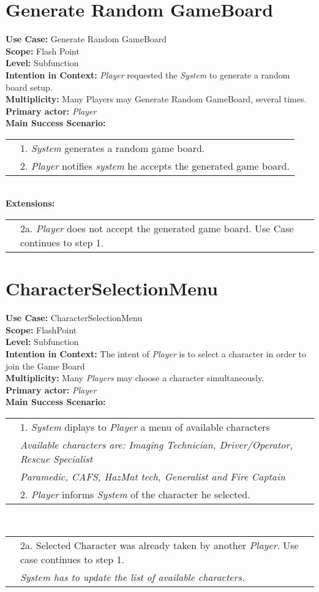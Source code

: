 \documentclass{article}
\begin{document}
	\section*{Generate Random GameBoard}
	\textbf{Use Case:} Generate Random GameBoard\\
	\textbf{Scope:} Flash Point\\
	\textbf{Level:} Subfunction\\
	\textbf{Intention in Context:} \textit{Player} requested the  \textit{System} to generate a random board setup.\\
	\textbf{Multiplicity:} Many Players may Generate Random GameBoard, several times.\\
	\textbf{Primary actor:} \textit{Player}\\
	\textbf{Main Success Scenario:}\\
	\begin{tabular}{l l}
		&1. \textit{System} generates a random game board.\\
		&2. \textit{Player} notifies \textit{system} he accepts the generated game board.
	\end{tabular}\\
	\textbf{Extensions:}\\
	\begin{tabular}{l l}
		&2a. \textit{Player} does not accept the generated game board. Use Case continues to step 1. 
	\end{tabular}
	\section*{CharacterSelectionMenu}
	\textbf{Use Case:} CharacterSelectionMenu\\
	\textbf{Scope:} FlashPoint\\
	\textbf{Level:}  Subfunction\\
	\textbf{Intention in Context:} The intent of \textit{Player} is to select a character in order to join the Game Board\\
	\textbf{Multiplicity:} Many \textit{Players} may choose a character simultaneously.\\
	\textbf{Primary actor:} \textit{Player}\\
	\textbf{Main Success Scenario:}\\
	\begin{tabular}{l l}
		&1. \textit{System} diplays to \textit{Player} a menu of available characters\\
		&\qquad\textit{Available characters are: Imaging Technician, Driver/Operator, Rescue Specialist}\\
		&\qquad\qquad\textit{Paramedic, CAFS, HazMat tech, Generalist and Fire Captain }\\
		&2. \textit{Player} informs \textit{System} of the character he selected.
	\end{tabular}\\
	\begin{tabular}{l l}
		&2a. Selected Character was already taken by another \textit{Player}. Use case continues to step 1.\\
		&\qquad\textit{System has to update the list of available characters.}
	\end{tabular}
\end{document}
